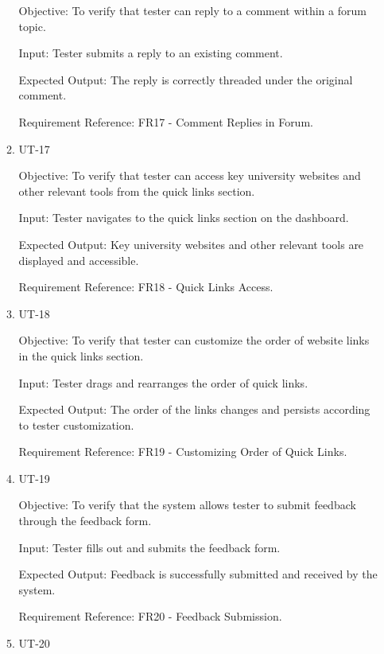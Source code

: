 \documentclass[12pt, titlepage]{article}
\begin{document}
\begin{enumerate}
\begin{enumerate}
        Objective: To verify that tester can reply to a comment within a forum topic.
        
        Input: Tester submits a reply to an existing comment.
        
        Expected Output: The reply is correctly threaded under the original comment.
        
        Requirement Reference: FR17 - Comment Replies in Forum.
        
    \item{UT-17\\}\label{UT-17}
    
        Objective: To verify that tester can access key university websites and other relevant tools from the quick links section.
        
        Input: Tester navigates to the quick links section on the dashboard.
        
        Expected Output: Key university websites and other relevant tools are displayed and accessible.
        
        Requirement Reference: FR18 - Quick Links Access.
        
    \item{UT-18\\}\label{UT-18}
    
        Objective: To verify that tester can customize the order of website links in the quick links section.
        
        Input: Tester drags and rearranges the order of quick links.
        
        Expected Output: The order of the links changes and persists according to tester customization.
        
        Requirement Reference: FR19 - Customizing Order of Quick Links.
        
    \item{UT-19\\}\label{UT-19}
    
        Objective: To verify that the system allows tester to submit feedback through the feedback form.
        
        Input: Tester fills out and submits the feedback form.
        
        Expected Output: Feedback is successfully submitted and received by the system.
        
        Requirement Reference: FR20 - Feedback Submission.
        
    \item{UT-20\\}\label{UT-20}
    

\end{enumerate}
\end{enumerate}
\end{document}

